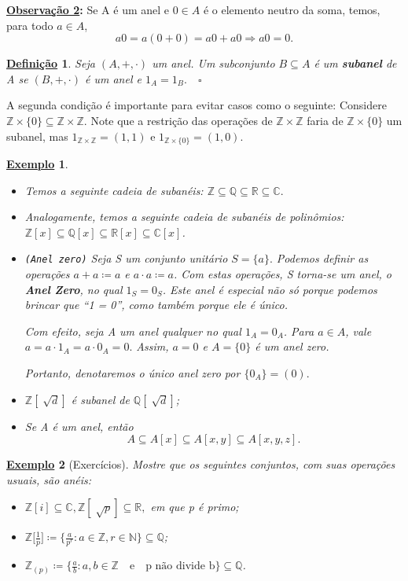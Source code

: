 \documentclass{article}
\newtheorem*{def*}{\underline{Defini\c c\~ao}}
\newtheorem{example}{\underline{Exemplo}}
\begin{document}
\textbf{\underline{Observação 2}:} Se A é um anel e \(0\in A\) é o elemento neutro da soma, temos, para todo \(a\in A\), 
\[
  a0 = a(0+0) = a0 + a0 \Rightarrow a0 = 0.
\]
\begin{def*}
  Seja \((A, +, \cdot )\) um anel. Um subconjunto \(B\subseteq{A}\) é um \textbf{subanel} de A se \((B, +, \cdot )\) é um anel e \(1_{A} = 1_{B}.\quad\square\)
\end{def*}
A segunda condição é importante para evitar casos como o seguinte: Considere \(\mathbb{Z}\times \{0\}\subseteq{\mathbb{Z}\times \mathbb{Z}}.\) Note que a restrição
das operações de \(\mathbb{Z}\times \mathbb{Z}\) faria de \(\mathbb{Z}\times \{0\}\) um subanel, mas \(1_{\mathbb{Z}\times \mathbb{Z}} = (1, 1)\) e \(1_{\mathbb{Z}\times\{0\}}=(1, 0).\)
\begin{example}
  \begin{itemize}
    \item[i)] Temos a seguinte cadeia de subanéis: \(\mathbb{Z}\subseteq{\mathbb{Q}}\subseteq{\mathbb{R}}\subseteq{\mathbb{C}}.\)
    \item[ii)] Analogamente, temos a seguinte cadeia de subanéis de polinômios: \(\mathbb{Z}[x]\subseteq{\mathbb{Q}[x]}\subseteq{\mathbb{R}[x]}\subseteq{\mathbb{C}[x]}\).
    \item[iii)]\texttt{(Anel zero)} Seja S um conjunto unitário \(S = \{a\}.\) Podemos definir as operações \(a + a\coloneqq a\) e \(a \cdot a\coloneqq a\). Com estas operações,
      S torna-se um anel, o \textbf{Anel Zero}, no qual \(1_{S} = 0_{S}\). Este anel é especial não só porque podemos brincar que ``1 = 0'', como também porque ele é \textit{único}.

      Com efeito, seja A um anel qualquer no qual \(1_{A} = 0_{A}\). Para \(a\in A\), vale \(a = a \cdot 1_{A} = a \cdot 0_{A} = 0.\) Assim, \(a = 0\) e \(A = \{0\}\) é 
      um anel zero. 

      Portanto, denotaremos o único anel zero por \(\{0_{A}\} = (0).\)
    \item[iv)] \(\mathbb{Z}[\sqrt[]{d}]\) é subanel de \(\mathbb{Q}[\sqrt[]{d}]\);
    \item[v)] Se A é um anel, então 
      \[
        A\subseteq A[x] \subseteq A[x, y] \subseteq A[x, y, z].
      \]
  \end{itemize}
\end{example}
\begin{example}[Exercícios]
  Mostre que os seguintes conjuntos, com suas operações usuais, são anéis:
  \begin{itemize}
    \item[a)] \(\mathbb{Z}[i] \subseteq{\mathbb{C}}, \mathbb{Z}[\sqrt[]{p}]\subseteq{\mathbb{R}},\) em que p é primo;
    \item[b)] \(\mathbb{Z}\biggl[\frac{1}{p}\biggr]\coloneqq \biggl\{\frac{a}{p^{r}}: a\in \mathbb{Z}, r\in \mathbb{N}\biggr\}\subseteq{\mathbb{Q}}\);
    \item[c)] \(\mathbb{Z}_{(p)}\coloneqq \biggl\{\frac{a}{b}: a, b\in \mathbb{Z}\quad \text{e}\quad \text{p não divide b} \biggr\}\subseteq{\mathbb{Q}}\).
  \end{itemize}
\end{example}
\end{document}
